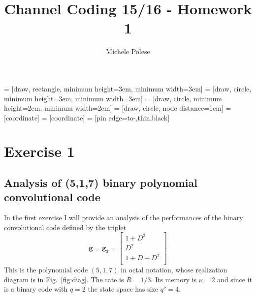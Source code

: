 \documentclass[10pt]{article}
\begin{document}
\title{Channel Coding 15/16 - Homework 1}
\author{Michele Polese}

\maketitle

 = [draw, rectangle, 
    minimum height=3em, minimum width=3em]
 = [draw, circle, minimum height=3em, minimum width=3em]
 = [draw, circle, minimum height=2em, minimum width=2em]
 = [draw, circle, node distance=1cm]
 = [coordinate]
 = [coordinate]
 = [pin edge={to-,thin,black}]


\section{Exercise 1}

\subsection{Analysis of (5,1,7) binary polynomial convolutional code}

In the first exercise I will provide an analysis of the performances of the binary convolutional code defined by the triplet 
\begin{equation}
	\mathbf{g} = \mathbf{g}_3 = \begin{bmatrix}
			1 + D^2 \\
			D^2	\\
			1 + D + D^2 \\
			\end{bmatrix}
\end{equation}
This is the polynomial code $(5,1,7)$ in octal notation, whose realization diagram is in Fig.~\ref{fig:diag}. The rate is $R = 1/3$. Its memory is $\nu = 2$ and since it is a binary code with $q = 2$ the state space has size $q^\nu = 4$. %
\end{document}
